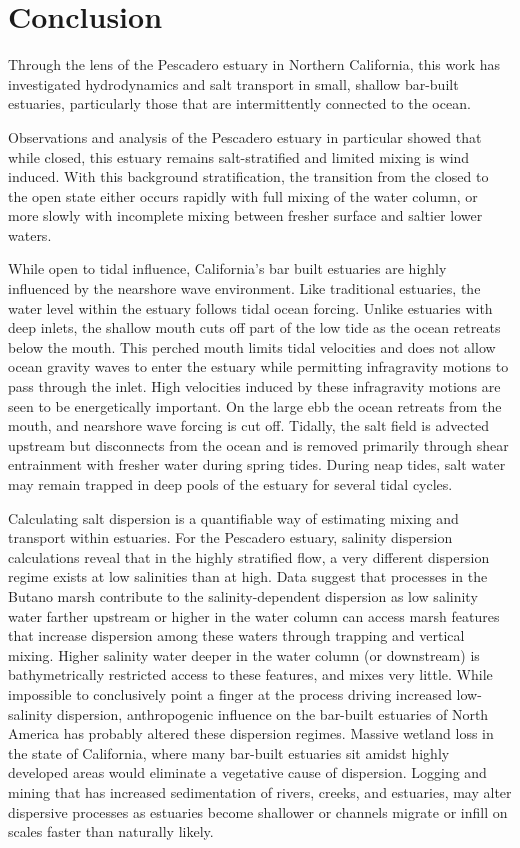 \chapter{Conclusion}
\label{conclusion}

Through the lens of the Pescadero estuary in Northern California, this work has investigated hydrodynamics and salt transport in small, shallow bar-built estuaries, particularly those that are intermittently connected to the ocean. 

Observations and analysis of the Pescadero estuary in particular showed that while closed, this estuary remains salt-stratified and limited mixing is wind induced. With this background stratification, the transition from the closed to the open state either occurs rapidly with full mixing of the water column, or more slowly with incomplete mixing between fresher surface and saltier lower waters. 

While open to tidal influence, California's bar built estuaries are highly influenced by the nearshore wave environment. Like traditional estuaries, the water level within the estuary follows tidal ocean forcing. Unlike estuaries with deep inlets, the shallow mouth cuts off part of the low tide as the ocean retreats below the mouth. This perched mouth limits tidal velocities and does not allow ocean gravity waves to enter the estuary while permitting infragravity motions to pass through the inlet. High velocities induced by these infragravity motions are seen to be energetically important. On the large ebb the ocean retreats from the mouth, and nearshore wave forcing is cut off. Tidally, the salt field is  advected upstream but disconnects from the ocean and is removed primarily through shear entrainment with fresher water during spring tides. During neap tides, salt water may remain trapped in deep pools of the estuary for several tidal cycles. 

Calculating salt dispersion is a quantifiable way of estimating mixing and transport within estuaries. For the Pescadero estuary, salinity dispersion calculations reveal that in the highly stratified flow, a very different dispersion regime exists at low salinities than at high. Data suggest that processes in the Butano marsh contribute to the salinity-dependent dispersion as low salinity water farther upstream or higher in the water column can access marsh features that increase dispersion among these waters through trapping and vertical mixing. Higher salinity water deeper in the water column (or downstream) is bathymetrically restricted access to these features, and mixes very little. While impossible to conclusively point a finger at the process driving increased low-salinity dispersion, anthropogenic influence on the bar-built estuaries of North America has probably altered these dispersion regimes. Massive wetland loss in the state of California, where many bar-built estuaries sit amidst highly developed areas would eliminate a vegetative cause of dispersion. Logging and mining that has increased sedimentation of rivers, creeks, and estuaries, may alter dispersive processes as estuaries become shallower or channels migrate or infill on scales faster than naturally likely.  

